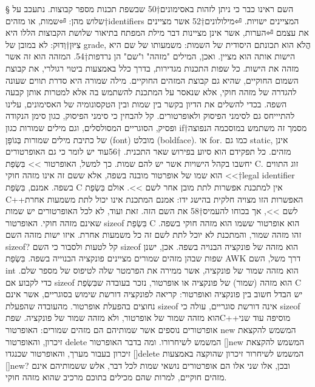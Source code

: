 \begin{טבלא}[!htbp]
§ השם
      ראינו כבר כי ניתן לזהות באסימונים†{50} שבשפת תכנות מספר קבוצות. נתעכב על שלוש מהן:
⏎שמות, או מזהים†{identifiers} המציינים ישויות.
⏎מילולונים†{52} אשר מציינים את עצמם
⏎הערות, אשר אינן מציינות דבר
      מילת המפתח בתיאור שלושת הקבוצות הללו היא צִיּוּן†{וְדוּק: לא במובן של grade}, הֲלֹא הוא תכונתם היסודית של השמות: משמעותו של שם היא הישות אותה הוא מציין. ואכן, המילים "מזהה" ו"שם" הן נרדפות†{54}. המזהה הוא זה אשר מזהה את הישות.
      כל שפות התכנות מגדירות, בדרך כלל באמצעות ביטוי רגולרי, את קבוצת השמום החוקיים, שהיא גם קבוצת המזהים החוקיים. מילה שמורה היא סדרת תווים שעונה להגדרה של מזהה חוקי, אלא שנאסר על המתכנת להשתמש בה אלא למטרות אותן קבעה השפה.
      בכדי להשלים את הדיון בקשר בין שמות ובין הטקסונומיה של האסימונים, עלינו להתיייחס גם לסימני הפיסוק ולאופרטורים. קל להבחין כי סימני הפיסוק, כגון סימן הנקודה ופסיק, הסוגריים המסולסלים, וגם מילים שמורות כגון if†{מסמך זה משתמש במוסכמה הנפוצה של כתיבת מילים שמורות בְּגוֹפָן (font) מובלט (boldface).} או for. כמו גם static, אינן מזהים. כל תפקידם הוא סיוע בפירוש שאר התכנית.
†{56}עוד יש לומר כי גם האופרטורים יחשבו בקהל הישויות אשר יש להם שמות. כך למשל, האופרטור >> בִּשְׂפַת C. זוג התווים >> הוא שמו של אופרטור מובנה בשפה, אלא ששם זה אינו מזהה חוקי†{legal identifier} בשפה. אמנם, בִּשְׂפַת C אין למתכנת אפשרות לתת מובן אחר לשם >>. אולם בִּשְׂפַת C++האפשרות הזו מצויה חלקית בהישג ידו: אמנם המתכנת אינו יכול לתת משמעות אחרת לשם >>, אך בכוחו להעמיס†{58} את השם הזה. זאת ועוד, לא לכל האופרטורים יש שמות שאינם מזהה חוקי. האופרטור sizeof בִּשְׂפַת C הוא אופרטור ששמו הוא מזהה חוקי בשפה. זהו מזהה שמור, והמתכנת לא יוכל לתת לשם זה כל משמעות אחרת.
      איזו ישות מזהה השם sizeof? קל לטעות ולסבור כי השם sizeof הוא מזהה של פונקציה הבנויה בשפה. אכן, ישנן שפות שבהן מזהים שמורים מציינים פונקציה הבנוייה בשפה. בִּשְׂפַת AWK דרך משל, השם int הוא מזהה שמור של פונקציה, אשר ממירה את הפרמטר שלה לטיפוס של מספר שלם.
      כדי לקבוע אם sizeof הוא מזהה (שמור) של פונקציה או אופרטור, נזכר בעובדה שבִּשְׂפַת C יש הבדל חשוב בין פונקציה ואופרטור: קריאה לפונקציה דורשת שימוש בסוגריים, אשר אינם נחוצים בהפעלת אופרטור. מהעובדה שהפעלת sizeof אינה דורשת סוגריים, עולה כי sizeof הוא מזהה שמור של אופרטור, ולא מזהה שמור של פונקציה.
      שפתC++מוסיפה עוד שני אופרטורים נוספים אשר שמותיהם הם מזהים שמורים: האופרטור new המשמש להקצאת זיכרון, והאופרטור delete המשמש לשיחרורו. ומה בדבר האופרטור []new המשמש להקצאת זיכרון בעבור מערך, והאופרטור שכנגדו []delete המשמש לשיחרור זיכרון שהוקצה באמצעות []new? ובכן, אלו שני אלו הם אופרטורים נושאי שמות לכל דבר, אלש ששמותיהם אינם מזהים חוקיים, למרות שהם מכילים בתוכם מרכיב שהוא מזהה חוקי.

\end{טבלא}
